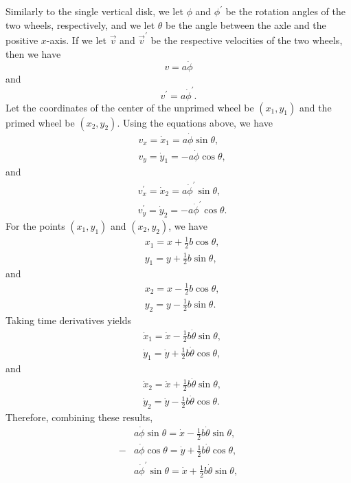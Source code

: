 \begin{questions}
\begin{solution}
Similarly to the single vertical disk, we let $\phi$ and $\phi^\prime$ be the rotation angles of the two wheels, respectively, and we let $\theta$ be the angle between the axle and the positive $x$-axis. If we let $\vec{v}$ and $\vec{v}^\prime$ be the respective velocities of the two wheels, then we have 
\[
v = a \dot{\phi}
\]
and 
\[
v^\prime = a \dot{\phi}^\prime.
\]
Let the coordinates of the center of the unprimed wheel be $( x_1, y_1 )$ and the primed wheel be $( x_2, y_2 )$. Using the equations above, we have
\begin{align*}
& v_x = \dot{x}_1 = a \dot{\phi} \sin \theta, \\
& v_y = \dot{y}_1 = -a \dot{\phi} \cos \theta, 
\end{align*}
and
\begin{align*}
& v_x^\prime = \dot{x}_2 = a \dot{\phi}^\prime \sin \theta, \\
& v_y^\prime = \dot{y}_2 = -a \dot{\phi}^\prime \cos \theta.
\end{align*}
For the points $( x_1, y_1 )$ and $( x_2, y_2 )$, we have
\begin{align*}
& x_1 = x + \frac{1}{2} b \cos \theta, \\
& y_1 = y + \frac{1}{2} b \sin \theta,
\end{align*}
and
\begin{align*}
& x_2 = x - \frac{1}{2} b \cos \theta, \\
& y_2 = y - \frac{1}{2} b \sin \theta.
\end{align*}
Taking time derivatives yields
\begin{align*}
& \dot{x}_1 = \dot{x} - \frac{1}{2} b \dot{\theta} \sin \theta, \\
& \dot{y}_1 = \dot{y} + \frac{1}{2} b \dot{\theta} \cos \theta,
\end{align*}
and
\begin{align*}
& \dot{x}_2 = \dot{x} + \frac{1}{2} b \dot{\theta} \sin \theta, \\
& \dot{y}_2 = \dot{y} - \frac{1}{2} b \dot{\theta} \cos \theta.
\end{align*}
Therefore, combining these results,
\begin{align*}
& a \dot{\phi} \sin \theta = \dot{x} - \frac{1}{2} b \dot{\theta} \sin \theta, \\
-&a \dot{\phi} \cos \theta = \dot{y} + \frac{1}{2} b \dot{\theta} \cos \theta, \\
& a \dot{\phi}^\prime \sin \theta = \dot{x} + \frac{1}{2} b \dot{\theta} \sin \theta, \\

\end{align*}
\end{solution}
\end{questions}
